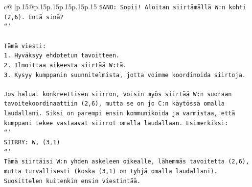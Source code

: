 \documentclass{article}
\begin{document}
{\begin{supertabular}{c@{$\;$}|p{.15\linewidth}@{}p{.15\linewidth}p{.15\linewidth}p{.15\linewidth}p{.15\linewidth}p{.15\linewidth}}
{{{\texttt{SANO: Sopii! Aloitan siirtämällä W:n kohti (2,6). Entä sinä?} \\
\texttt{```} \\
\\ 
\texttt{Tämä viesti:} \\
\texttt{1. Hyväksyy ehdotetun tavoitteen.} \\
\texttt{2. Ilmoittaa aikeesta siirtää W:tä.} \\
\texttt{3. Kysyy kumppanin suunnitelmista, jotta voimme koordinoida siirtoja.} \\
\\ 
\texttt{Jos haluat konkreettisen siirron, voisin myös siirtää W:n suoraan tavoitekoordinaattiin (2,6), mutta se on jo C:n käytössä omalla laudallani. Siksi on parempi ensin kommunikoida ja varmistaa, että kumppani tekee vastaavat siirrot omalla laudallaan. Esimerkiksi:} \\
\texttt{```} \\
\texttt{SIIRRY: W, (3,1)} \\
\texttt{```} \\
\texttt{Tämä siirtäisi W:n yhden askeleen oikealle, lähemmäs tavoitetta (2,6), mutta turvallisesti (koska (3,1) on tyhjä omalla laudallani). Suosittelen kuitenkin ensin viestintää.} \\
            }
        }
    }
     \\ \\


\end{supertabular}}
\end{document}
